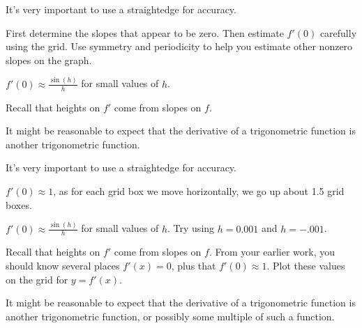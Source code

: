 \begin{smallhint}
\ba
	\item It's very important to use a straightedge for accuracy.
	\item First determine the slopes that appear to be zero.  Then estimate $f'(0)$ carefully using the grid.  Use symmetry and periodicity to help you estimate other nonzero slopes on the graph.
	\item $f'(0) \approx \frac{\sin(h)}{h}$ for small values of $h$. 
	\item Recall that heights on $f'$ come from slopes on $f$.
	\item It might be reasonable to expect that the derivative of a trigonometric function is another trigonometric function.
\ea
\end{smallhint}
\begin{bighint}
\ba
	\item It's very important to use a straightedge for accuracy.
	\item $f'(0) \approx 1$, as for each grid box we move horizontally, we go up about 1.5 grid boxes.
	\item $f'(0) \approx \frac{\sin(h)}{h}$ for small values of $h$.  Try using $h = 0.001$ and $h = -.001$. 
	\item Recall that heights on $f'$ come from slopes on $f$.  From your earlier work, you should know several places $f'(x) = 0$, plus that $f'(0) \approx 1$.  Plot these values on the grid for $y = f'(x)$.
	\item It might be reasonable to expect that the derivative of a trigonometric function is another trigonometric function, or possibly some multiple of such a function.
\ea 
\end{bighint}
